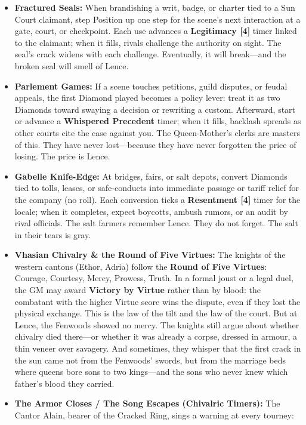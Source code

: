 \begin{itemize}
\item \textbf{Fractured Seals:} When brandishing a writ, badge, or charter tied to a Sun Court claimant, step Position up one step for the scene's next interaction at a gate, court, or checkpoint. Each use advances a \textbf{Legitimacy [4]} timer linked to the claimant; when it fills, rivals challenge the authority on sight. The seal's crack widens with each challenge. Eventually, it will break---and the broken seal will smell of Lence.
\item \textbf{Parlement Games:} If a scene touches petitions, guild disputes, or feudal appeals, the first Diamond played becomes a policy lever: treat it as two Diamonds toward swaying a decision or rewriting a custom. Afterward, start or advance a \textbf{Whispered Precedent} timer; when it fills, backlash spreads as other courts cite the case against you. The Queen-Mother's clerks are masters of this. They have never lost---because they have never forgotten the price of losing. The price is Lence.
\item \textbf{Gabelle Knife-Edge:} At bridges, fairs, or salt depots, convert Diamonds tied to tolls, leases, or safe-conducts into immediate passage or tariff relief for the company (no roll). Each conversion ticks a \textbf{Resentment [4]} timer for the locale; when it completes, expect boycotts, ambush rumors, or an audit by rival officials. The salt farmers remember Lence. They do not forget. The salt in their tears is gray.
\item \textbf{Vhasian Chivalry \& the Round of Five Virtues:} The knights of the western cantons (Ethor, Adria) follow the \textbf{Round of Five Virtues}: Courage, Courtesy, Mercy, Prowess, Truth. In a formal joust or a legal duel, the GM may award \textbf{Victory by Virtue} rather than by blood: the combatant with the higher Virtue score wins the dispute, even if they lost the physical exchange. This is the law of the tilt and the law of the court. But at Lence, the Fenwoods showed no mercy. The knights still argue about whether chivalry died there---or whether it was already a corpse, dressed in armour, a thin veneer over savagery. And sometimes, they whisper that the first crack in the sun came not from the Fenwoods' swords, but from the marriage beds where queens bore sons to two kings---and the sons who never knew which father's blood they carried.
\item \textbf{The Armor Closes / The Song Escapes (Chivalric Timers):} The Cantor Alain, bearer of the Cracked Ring, sings a warning at every tourney:

\end{itemize}
